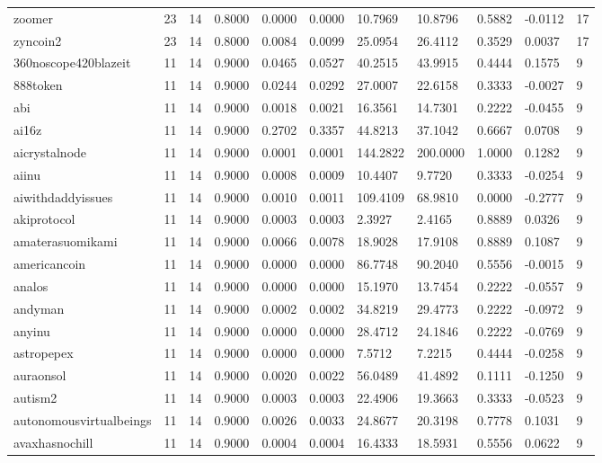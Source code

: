 \begin{table}[htbp]
\begin{tabular}{lllllllllll}
zoomer & 23 & 14 & 0.8000 & 0.0000 & 0.0000 & 10.7969 & 10.8796 & 0.5882 & -0.0112 & 17 \\
zyncoin2 & 23 & 14 & 0.8000 & 0.0084 & 0.0099 & 25.0954 & 26.4112 & 0.3529 & 0.0037 & 17 \\
360noscope420blazeit & 11 & 14 & 0.9000 & 0.0465 & 0.0527 & 40.2515 & 43.9915 & 0.4444 & 0.1575 & 9 \\
888token & 11 & 14 & 0.9000 & 0.0244 & 0.0292 & 27.0007 & 22.6158 & 0.3333 & -0.0027 & 9 \\
abi & 11 & 14 & 0.9000 & 0.0018 & 0.0021 & 16.3561 & 14.7301 & 0.2222 & -0.0455 & 9 \\
ai16z & 11 & 14 & 0.9000 & 0.2702 & 0.3357 & 44.8213 & 37.1042 & 0.6667 & 0.0708 & 9 \\
aicrystalnode & 11 & 14 & 0.9000 & 0.0001 & 0.0001 & 144.2822 & 200.0000 & 1.0000 & 0.1282 & 9 \\
aiinu & 11 & 14 & 0.9000 & 0.0008 & 0.0009 & 10.4407 & 9.7720 & 0.3333 & -0.0254 & 9 \\
aiwithdaddyissues & 11 & 14 & 0.9000 & 0.0010 & 0.0011 & 109.4109 & 68.9810 & 0.0000 & -0.2777 & 9 \\
akiprotocol & 11 & 14 & 0.9000 & 0.0003 & 0.0003 & 2.3927 & 2.4165 & 0.8889 & 0.0326 & 9 \\
amaterasuomikami & 11 & 14 & 0.9000 & 0.0066 & 0.0078 & 18.9028 & 17.9108 & 0.8889 & 0.1087 & 9 \\
americancoin & 11 & 14 & 0.9000 & 0.0000 & 0.0000 & 86.7748 & 90.2040 & 0.5556 & -0.0015 & 9 \\
analos & 11 & 14 & 0.9000 & 0.0000 & 0.0000 & 15.1970 & 13.7454 & 0.2222 & -0.0557 & 9 \\
andyman & 11 & 14 & 0.9000 & 0.0002 & 0.0002 & 34.8219 & 29.4773 & 0.2222 & -0.0972 & 9 \\
anyinu & 11 & 14 & 0.9000 & 0.0000 & 0.0000 & 28.4712 & 24.1846 & 0.2222 & -0.0769 & 9 \\
astropepex & 11 & 14 & 0.9000 & 0.0000 & 0.0000 & 7.5712 & 7.2215 & 0.4444 & -0.0258 & 9 \\
auraonsol & 11 & 14 & 0.9000 & 0.0020 & 0.0022 & 56.0489 & 41.4892 & 0.1111 & -0.1250 & 9 \\
autism2 & 11 & 14 & 0.9000 & 0.0003 & 0.0003 & 22.4906 & 19.3663 & 0.3333 & -0.0523 & 9 \\
autonomousvirtualbeings & 11 & 14 & 0.9000 & 0.0026 & 0.0033 & 24.8677 & 20.3198 & 0.7778 & 0.1031 & 9 \\
avaxhasnochill & 11 & 14 & 0.9000 & 0.0004 & 0.0004 & 16.4333 & 18.5931 & 0.5556 & 0.0622 & 9 \\

\end{tabular}
\end{table}
